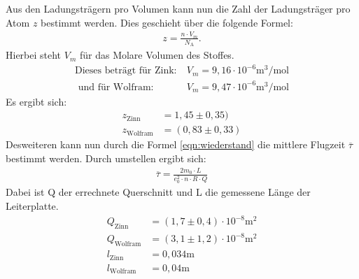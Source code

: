 Aus den Ladungsträgern pro Volumen kann nun die Zahl der Ladungsträger pro Atom $z$
bestimmt werden. Dies geschieht über die folgende Formel:
\begin{align}
  z=\frac{n \cdot V_m}{N_\mathrm{A}}.
\end{align}
Hierbei steht $V_m$ für das Molare Volumen des Stoffes.
\begin{align*}
\text{Dieses beträgt für Zink:}& \ V_m=9,16\cdot10^{-6}\si{\meter\tothe{3}\per\mol}\\
\text{ und für Wolfram}:& \ V_m=9,47\cdot10^{-6}\si{\meter\tothe{3}\per\mol}
\end{align*}
Es ergibt sich:
\begin{align}
z_\mathrm{Zinn}&=1,45\pm0,35)\\ %
z_\mathrm{Wolfram}&=(0,83\pm0,33)
\end{align}
Desweiteren kann nun durch die Formel \eqref{eqn:wiederstand} die mittlere
Flugzeit $\overline\tau$ bestimmt werden. Durch umstellen ergibt sich:
\begin{align}
  \overline{\tau}=\frac{2m_0\cdot L}{e_0^2 \cdot n \cdot R \cdot Q}
\end{align}
Dabei ist Q der errechnete Querschnitt und L die gemessene Länge der Leiterplatte.
\begin{align*}
  Q_\mathrm{Zinn}&=(1,7\pm0,4)\cdot10^{-8}\si{\square\meter}\\
  Q_\mathrm{Wolfram}&=(3,1\pm1,2)\cdot10^{-8}\si{\square\meter}\\
l_\mathrm{Zinn}&=0,034\si{\meter}\\
l_\mathrm{Wolfram}&=0,04\si{\meter}\\
\end{align*}

